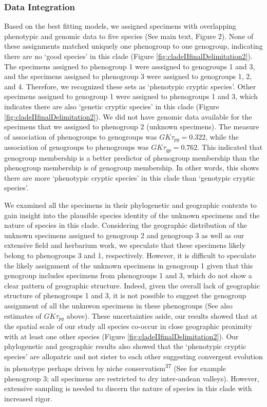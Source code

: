 \documentclass[
  11pt,
]{article}
\begin{document}
\hypertarget{data-integration-2}{%
\subsubsection{Data Integration}\label{data-integration-2}}

Based on the best fitting models, we assigned specimens with overlapping phenotypic and genomic data to five species (See main text, Figure 2). None of these assignments matched uniquely one phenogroup to one genogroup, indicating there are no `good species' in this clade (Figure \ref{fig:cladeIIfinalDelimitation2}). The specimens assigned to phenogroup 1 were asssigned to genogroups 1 and 3, and the specimens assigned to phenogroup 3 were assigned to genogroups 1, 2, and 4. Therefore, we recognized these sets as `phenotypic cryptic species'. Other specimens assigned to genogroup 1 were assigned to phenogroups 1 and 3, which indicates there are also `genetic cryptic species' in this clade (Figure \ref{fig:cladeIIfinalDelimitation2}). We did not have genomic data available for the specimens that we assigned to phenogroup 2 (unknown specimens). The measure of association of phenogroups to genogroups was \(GK\tau_{pg}=0.322\), while the association of genogroups to phenogroups was \(GK\tau_{gp}=0.762\). This indicated that genogroup membership is a better predictor of phenogroup membership than the phenogroup membership is of genogroup membership. In other words, this shows there are more `phenotypic cryptic species' in this clade than `genotypic cryptic species'.

We examined all the specimens in their phylogenetic and geographic contexts to gain insight into the plausible species identity of the unknown specimens and the nature of species in this clade. Considering the geographic distribution of the unknown specimens assigned to genogroup 2 and genogroup 3 as well as our extensive field and herbarium work, we speculate that these specimens likely belong to phenogroups 3 and 1, respectively. However, it is difficult to speculate the likely assignment of the unknown specimens in genogroup 1 given that this genogroup includes specimens from phenogroups 1 and 3, which do not show a clear pattern of geographic structure. Indeed, given the overall lack of geographic structure of phenogroups 1 and 3, it is not possible to suggest the genogroup assignment of all the unknwon specimens in these phenogroups (See also estimates of \(GK\tau_{pg}\) above). These uncertainties aside, our results showed that at the spatial scale of our study all species co-occur in close geographic proximity with at least one other species (Figure \ref{fig:cladeIIfinalDelimitation2}). Our phylogenetic and geographic results also showed that the `phenotypic cryptic species' are allopatric and not sister to each other suggesting convergent evolution in phenotype perhaps driven by niche conservatism\textsuperscript{37} (See for example phenogroup 3; all specimens are restricted to dry inter-andean valleys). However, extensive sampling is needed to discern the nature of species in this clade with increased rigor.
\end{document}
